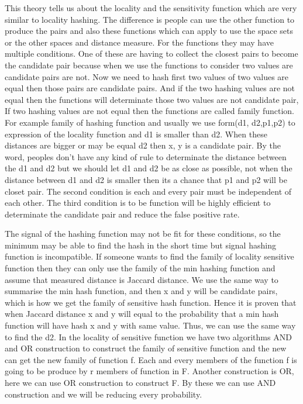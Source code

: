 \documentclass[12t]{article}
\begin{document}
	This theory tells us about the locality and the sensitivity function which are very similar to locality hashing. The difference is people can use the other function to produce the pairs and also these functions which can apply to use the space sets or the other spaces and distance measure. For the functions they may have multiple conditions. One of these are having to collect the closest pairs to become the candidate pair because when we use the functions to consider two values are candidate pairs are not. Now we need to hash first two values of two values are equal then those pairs are candidate pairs. And if the two hashing values are not equal then the functions will determinate those two values are not candidate pair, If two hashing values are not equal then the functions are called family function.  For example family of hashing function and usually we use form(d1, d2,p1,p2) to expression of the locality function and d1 is smaller than d2. When these distances are bigger or may be equal d2 then x, y is a candidate pair. By the word, peoples don't have any kind of rule to determinate the distance between the d1 and d2 but we should let d1 and d2 be as close as possible, not when the distance between d1 and d2 is smaller then its a chance that p1 and p2 will be closet pair. The second condition is each and every pair must be independent of each other. The third condition is to be function will be highly efficient to determinate the candidate pair and reduce the false positive rate.
	
	The signal of the hashing function may not be fit for these conditions, so the minimum may be able to find the hash in the short time but signal hashing function is incompatible. If someone wants to find the family of locality sensitive function then they can only use the family of the min hashing function and assume that measured distance is Jaccard distance. We use the same way to summarise the min hash function, and then x and y will be candidate pairs, which is how we get the family of sensitive hash function. Hence it is proven that when Jaccard distance x and y will equal to the probability that a min hash function will have hash x and y  with same value. Thus, we can use the same way to find the d2.  In the locality of sensitive function we have two algorithms AND and OR construction to construct the family of sensitive function and the new can get the new family of function f. Each and every members of the function f is going to be produce by r members of function in F. Another construction is OR, here we can use OR construction to construct F. By these we can use AND construction and we will be reducing every probability.  
\end{document}
